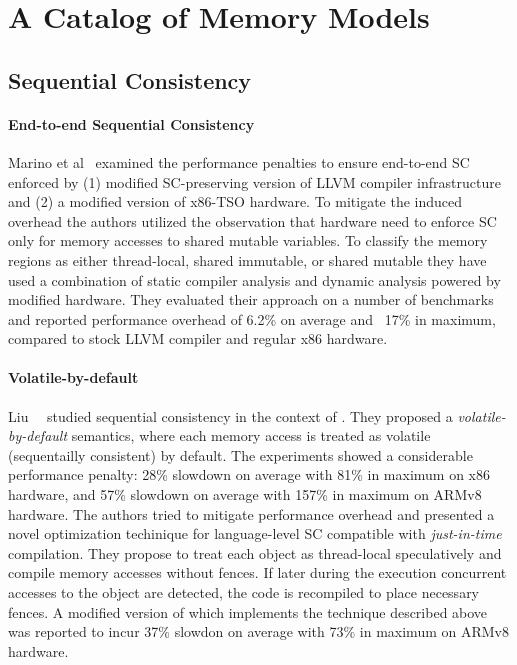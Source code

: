 \section{A Catalog of Memory Models}

\subsection{Sequential Consistency}
\label{sec:catalog:sc}

\paragraph{End-to-end Sequential Consistency}

Marino et al~\cite{Marino-al:PLDI11, Singh-al:ISCA12} 
examined the performance penalties to ensure end-to-end SC
enforced by (1) modified SC-preserving version 
of LLVM compiler infrastructure and 
(2) a modified version of x86-TSO hardware. 
To mitigate the induced overhead the authors 
utilized the observation that hardware need to 
enforce SC only for memory accesses to shared mutable variables. 
To classify the memory regions as either thread-local,
shared immutable, or shared mutable they have used 
a combination of static compiler analysis and 
dynamic analysis powered by modified hardware. 
They evaluated their approach on a number of benchmarks
and reported performance overhead of 6.2\% on average 
and ~17\% in maximum, compared to stock LLVM compiler 
and regular x86 hardware. 

\paragraph{Volatile-by-default}

Liu~\etal~\cite{Liu-al:OOPSLA17, Liu-al:PLDI19} studied 
sequential consistency in the context of \Java.  
They proposed a \emph{volatile-by-default} semantics,
where each memory access is treated as volatile 
(\ie sequentailly consistent) by default. 
The experiments showed a considerable performance penalty:
28\% slowdown on average with 81\% in maximum on x86 hardware,
and 57\% slowdown on average with 157\% in maximum on ARMv8 hardware.
The authors tried to mitigate performance overhead and presented  
a novel optimization techinique for language-level SC
compatible with \emph{just-in-time} compilation. 
They propose to treat each object as thread-local speculatively 
and compile memory accesses without fences. 
If later during the execution concurrent accesses to the object  
are detected, the code is recompiled to place necessary fences.
A modified version of \JVM which implements the technique
described above was reported to incur 37\% slowdon on average 
with 73\% in maximum on ARMv8 hardware.

